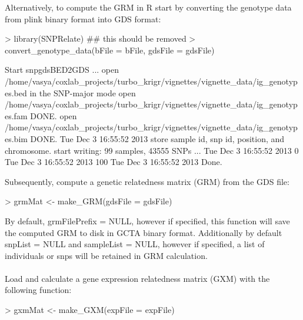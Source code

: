 \documentclass[a4paper]{article}
\begin{document}
Alternatively, to compute the GRM in R start by converting the genotype data from plink binary format into GDS format:
\begin{Schunk}

\begin{Schunk}
\begin{Sinput}
> library(SNPRelate) ## this should be removed
> convert_genotype_data(bFile = bFile, gdsFile = gdsFile)
\end{Sinput}
\begin{Soutput}
Start snpgdsBED2GDS ...
	open /home/vasya/coxlab_projects/turbo_krigr/vignettes/vignette_data/ig_genotypes.bed in the SNP-major mode
	open /home/vasya/coxlab_projects/turbo_krigr/vignettes/vignette_data/ig_genotypes.fam DONE.
	open /home/vasya/coxlab_projects/turbo_krigr/vignettes/vignette_data/ig_genotypes.bim DONE.
Tue Dec  3 16:55:52 2013 	store sample id, snp id, position, and chromosome.
	start writing: 99 samples, 43555 SNPs ...
 	Tue Dec  3 16:55:52 2013	0%
 	Tue Dec  3 16:55:52 2013	100%
Tue Dec  3 16:55:52 2013 	Done.
\end{Soutput}
\end{Schunk}

\end{Schunk}
Subsequently, compute a genetic relatedness matrix (GRM) from the GDS file: 
\begin{Schunk}

\begin{Schunk}
\begin{Sinput}
> grmMat <- make_GRM(gdsFile = gdsFile)
\end{Sinput}
\end{Schunk}

\end{Schunk}
By default, grmFilePrefix = NULL, however if specified, this function will save the computed GRM to disk in GCTA binary format. Additionally by default snpList = NULL and sampleList = NULL, however if specified, a list of individuals or snps will be retained in GRM calculation.
\\
\\
Load and calculate a gene expression relatedness matrix (GXM) with the following function:
\begin{Schunk}

\begin{Schunk}
\begin{Sinput}
> gxmMat <- make_GXM(expFile = expFile)
\end{Sinput}
\end{Schunk}

\end{Schunk}
\end{document}
